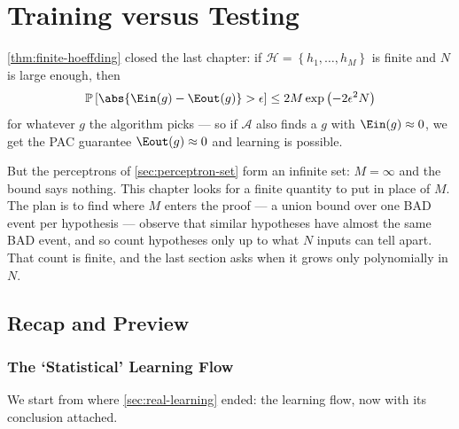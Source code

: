 \chapter{Training versus Testing}

\begin{prev}
    \autoref{thm:finite-hoeffding} closed the last chapter: if
    \(\mathcal{H} = \left\{ h_1, \dots , h_M \right\}\) is finite and \(N\) is
    large enough, then
    \[
        \mathbb{P}\left[ \abs{\Ein(g) - \Eout(g)} > \epsilon \right]
        \le 2 M \exp \left( -2 \epsilon^2 N \right)
    \]
    for whatever \(g\) the algorithm picks --- so if \(\mathcal{A}\) also finds
    a \(g\) with \(\Ein(g) \approx 0\), we get the PAC guarantee
    \(\Eout(g) \approx 0\) and learning is possible.
\end{prev}

But the perceptrons of \autoref{sec:perceptron-set} form an infinite set:
\(M = \infty\) and the bound says nothing. This chapter looks for a finite
quantity to put in place of \(M\). The plan is to find where \(M\) enters the
proof --- a union bound over one BAD event per hypothesis --- observe that
similar hypotheses have almost the same BAD event, and so count hypotheses only
up to what \(N\) inputs can tell apart. That count is finite, and the last
section asks when it grows only polynomially in \(N\).

\section{Recap and Preview}\label{sec:recap-preview}


\subsection{The `Statistical' Learning Flow}

We start from where \autoref{sec:real-learning} ended: the learning flow,
now with its conclusion attached.

